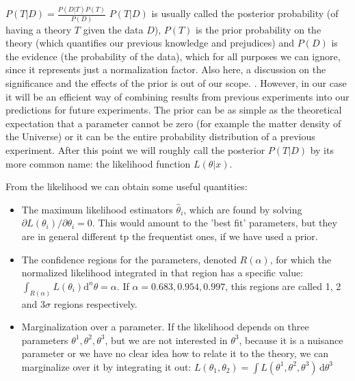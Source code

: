 \beeq$ \label{eq:BayesTheorem}
P(T | D) = \frac{P(D | T) P(T)}{P(D)}$
$P(T | D)$ is usually called the posterior probability (of having a theory $T$ given the data $D$), 
$P(T)$ is the prior probability on the theory (which quantifies our previous knowledge and prejudices)
and $P(D)$ is the evidence (the probability of the data), which for all purposes we can ignore, since it
represents just a normalization factor.
Also here, a discussion on the significance and the effects of the prior is out of our scope. \cite{cite Amendola, Dodelson, Gregory, reviews}. However, in our case it will be an efficient way of combining results from previous
experiments into our predictions for future experiments. The prior can be as simple as the theoretical expectation
that a parameter cannot be zero (for example the matter density of the Universe) or it can be the entire
probability distribution of a previous experiment.
After this point we will roughly call the posterior $P(T | D)$ by its more common name: the likelihood function
$L(\theta | x)$.

From the likelihood we can obtain some useful quantities:
\begin{itemize}
	\item The maximum likelihood estimators $\hat{\theta}_{i}$,
	which are found by solving \\ $\partial L(\theta_i)/\partial\theta_i = 0$.
	This would amount to the 'best fit' parameters, but they
	are in general different tp the frequentist ones, if we have used a prior.
	\item The confidence regions for the parameters, denoted $R(\alpha)$, for which
	the normalized likelihood integrated in that region has a specific value:\\ $\int_{R(\alpha)}  L(\theta_i) \mathrm{d}^n \theta = \alpha$.
	If $\alpha=0.683,0.954,0.997$, this regions are called 1, 2 and 3$\sigma$ regions respectively.
	\item Marginalization over a parameter. If the likelihood depends on 
	three parameters $\theta^1, \theta^2, \theta^3$, but we are not interested in $\theta^3$, because it is a nuisance parameter
	or we have no clear idea how to relate it to the theory, we can marginalize over it by integrating 
	it out: $L(\theta_1, \theta_2) = \int L(\theta^1, \theta^2, \theta^3) \,\mathrm{d}\theta^3 $
	
\end{itemize}

